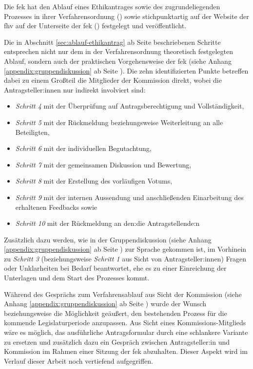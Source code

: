 \documentclass[a4paper,12pt,twoside]{scrreprt}
\begin{document}
Die \acl{fek} hat den Ablauf eines Ethikantrages sowie des zugrundeliegenden Prozesses in ihrer Verfahrensordnung (\cite{forschungsethik-kommission_der_fachhochschule_vorarlberg_verfahrensordnung_2020}) sowie stichpunktartig auf der Website der \ac{fhv} auf der Unterseite der \ac{fek} (\cite{fachhochschule_vorarlberg_gmbh_forschungsethik-kommission_2021}) festgelegt und veröffentlicht.

Die in Abschnitt \ref{sec:ablauf-ethikantrag} ab Seite \pageref{sec:ablauf-ethikantrag} beschriebenen Schritte entsprechen nicht nur dem in der Verfahrensordnung theoretisch festgelegten Ablauf, sondern auch der praktischen Vorgehensweise der \ac{fek} (siehe Anhang \ref{appendix:gruppendiskussion} ab Seite \pageref{appendix:gruppendiskussion}). Die zehn identifizierten Punkte betreffen dabei zu einem Großteil die Mitglieder der Kommission direkt, wobei die Antragsteller:innen nur indirekt involviert sind:
\begin{itemize}
    \item \textit{Schritt 4} mit der Überprüfung auf Antragsberechtigung und Vollständigkeit,
    \item \textit{Schritt 5} mit der Rückmeldung beziehungsweise Weiterleitung an alle Beteiligten,
    \item \textit{Schritt 6} mit der individuellen Begutachtung,
    \item \textit{Schritt 7} mit der gemeinsamen Diskussion und Bewertung,
    \item \textit{Schritt 8} mit der Erstellung des vorläufigen Votums,
    \item \textit{Schritt 9} mit der internen Aussendung und anschließenden Einarbeitung des erhaltenen Feedbacks sowie
    \item \textit{Schritt 10} mit der Rückmeldung an den:die Antragstellende:n
\end{itemize}

\noindent Zusätzlich dazu werden, wie in der Gruppendiskussion (siehe Anhang \ref{appendix:gruppendiskussion} ab Seite \pageref{appendix:gruppendiskussion}) zur Sprache gekommen ist, im Vorhinein zu \textit{Schritt 3} (beziehungsweise \textit{Schritt 1} aus Sicht von Antragsteller:innen) Fragen oder Unklarheiten bei Bedarf beantwortet, ehe es zu einer Einreichung der Unterlagen und dem Start des Prozesses kommt.

\medskip

Während des Gesprächs zum Verfahrensablauf aus Sicht der Kommission (siehe Anhang \ref{appendix:gruppendiskussion} ab Seite \pageref{appendix:gruppendiskussion}) wurde der Wunsch beziehungsweise die Möglichkeit geäußert, den bestehenden Prozess für die kommende Legislaturperiode anzupassen. Aus Sicht eines Kommissions-Mitglieds wäre es möglich, das ausführliche Antragsformular durch eine schlankere Variante zu ersetzen und zusätzlich dazu ein Gespräch zwischen Antragsteller:in und Kommission im Rahmen einer Sitzung der \ac{fek} abzuhalten. Dieser Aspekt wird im Verlauf dieser Arbeit noch vertiefend aufgegriffen.
\end{document}
